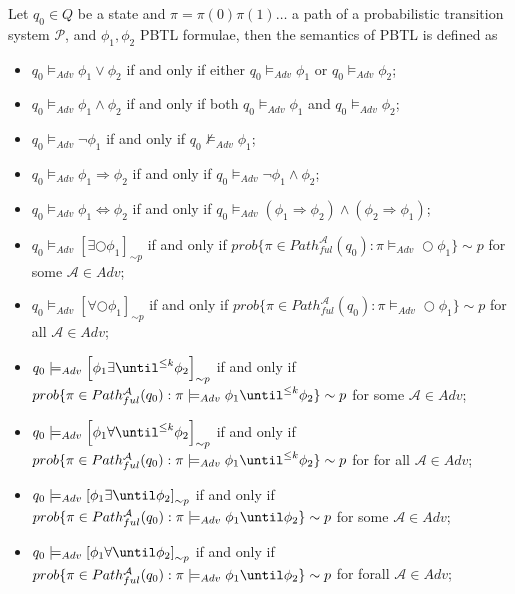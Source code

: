 \begin{defi}
    \label{def:semPBTL}
Let $q_{0}\in Q$ be a state and $\pi=\pi(0)\pi(1)\ldots$ a path of a probabilistic transition system $\mathcal{P}$, and $\phi_{1},\phi_{2}$ PBTL formulae, then the semantics of PBTL is defined as
\begin{itemize}
    \item{$q_{0}\models_{Adv}\phi_{1}\lor\phi_{2}$ if and only if either $q_{0}\models_{Adv}\phi_{1}$ or $q_{0}\models_{Adv}\phi_{2}$;}
    \item{$q_{0}\models_{Adv}\phi_{1}\land\phi_{2}$ if and only if both $q_{0}\models_{Adv}\phi_{1}$ and $q_{0}\models_{Adv}\phi_{2}$;}
    \item{$q_{0}\models_{Adv}\lnot\phi_{1}$ if and only if $q_{0}\not\models_{Adv}\phi_{1}$;}
    \item{$q_{0}\models_{Adv}\phi_{1}\Rightarrow\phi_{2}$ if and only if $q_{0}\models_{Adv}\lnot\phi_{1} \land \phi_{2}$;}
    \item{$q_{0}\models_{Adv}\phi_{1}\Leftrightarrow\phi_{2}$ if and only if $q_{0}\models_{Adv}(\phi_{1}\Rightarrow\phi_{2})\land(\phi_{2}\Rightarrow\phi_{1})$;}

    \item{$q_{0}\models_{Adv}\left[\exists\bigcirc\phi_{1}\right]_{\sim p}$ if and only if $prob\{\pi \in Path_{ful}^\mathcal{A}(q_{0}) : \pi \models_{Adv} \bigcirc\phi_{1}\} \sim p$ for some $\mathcal{A}\in Adv$;}
    \item{$q_{0}\models_{Adv}\left[\forall\bigcirc\phi_{1}\right]_{\sim p}$ if and only if $prob\{\pi \in Path_{ful}^\mathcal{A}(q_{0}) : \pi \models_{Adv} \bigcirc\phi_{1}\} \sim p$ for all $\mathcal{A}\in Adv$;}

    \item{$q_{0}\models_{Adv}\left[\phi_{1}\exists\until^{\leq k}\phi_{2}\right]_{\sim p}$
    if and only if $prob\{\pi\in Path_{ful}^\mathcal{A}(q_{0}) : \pi\models_{Adv}\phi_{1}\until^{\leq k} \phi_{2}\}\sim p$ for some $\mathcal{A}\in Adv$;}
    \item{$q_{0}\models_{Adv}\left[\phi_{1}\forall\until^{\leq k} \phi_{2}\right]_{\sim p}$
    if and only if $prob\{\pi\in Path_{ful}^\mathcal{A}(q_{0}) : \pi \models_{Adv} \phi_{1} \until^{\leq k} \phi_{2}\}\sim p$ for for all $\mathcal{A}\in Adv$;}

    \item{$q_{0}\models_{Adv}\left[\phi_{1}\exists\until \phi_{2}\right]_{\sim p}$
    if and only if $prob\{\pi\in Path_{ful}^\mathcal{A}(q_{0}) : \pi \models_{Adv} \phi_{1} \until\phi_{2}\}\sim p$ for some $\mathcal{A}\in Adv$;}
    \item{$q_{0}\models_{Adv}\left[\phi_{1}\forall\until \phi_{2}\right]_{\sim p}$
    if and only if $prob\{\pi\in Path_{ful}^\mathcal{A}(q_{0}) : \pi \models_{Adv} \phi_{1} \until \phi_{2}\}\sim p$ for forall $\mathcal{A}\in Adv$;}


\end{itemize}
\end{defi}
